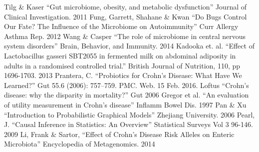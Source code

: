 \documentclass[a4paper]{article}
\begin{document}
\begin{thebibliography}{11}
 Tilg \& Kaser ``Gut microbiome, obesity, and metabolic
  dysfunction'' Journal of Clinical Investigation. 2011
 Fung, Garrett, Shahane \& Kwan ``Do Bugs Control Our
  Fate? The Influence of the Microbiome on Autoimmunity'' Curr Allergy
  Asthma Rep. 2012
 Wang \& Casper ``The role of microbiome in central
  nervous system disorders'' Brain, Behavior, and Immunity. 2014
 Kadooka et. al. ``Effect of Lactobacillus gasseri SBT2055
  in fermented milk on abdominal adiposity in adults in a randomised
  controlled trial.'' British Journal of Nutrition, 110, pp
  1696-1703. 2013
 Prantera, C. ``Probiotics for Crohn’s Disease: What
  Have We Learned?'' Gut 55.6 (2006): 757–759. PMC. Web. 15 Feb. 2016.
 Loftus ``Crohn’s disease: why the disparity in
  mortality?'' Gut 2006
  Gregor et al. ``An evaluation of utility measurement in Crohn's disease'' Inflamm Bowel Dis. 1997
 Pan \& Xu ``Introduction to Probabilistic
  Graphical Models'' Zhejiang University. 2006
 Pearl, J. ``Causal Inference in Statistics: An
  Overview'' Statistical Surveys Vol 3 96-146. 2009
 Li, Frank \& Sartor, “Effect of Crohn’s Disease Risk
  Alleles on Enteric Microbiota” Encyclopedia of Metagenomics. 2014


\end{thebibliography}
\end{document}
